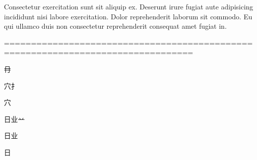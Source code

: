 \vspace{\mktsLineheight}\begin{multicols}{2}\raggedcolumns{}

Consectetur exercitation sunt sit aliquip ex. Deserunt irure fugiat aute adipisicing incididunt nisi labore exercitation.
Dolor reprehenderit laborum sit commodo. Eu qui ullamco duis non consectetur reprehenderit consequat amet fugiat
in.

=================================================================================

\null\par{\mktsTightParagraphs{}

{\cjk{}{\cnsym{}　}{\cnsym{}　}{\cnsym{}　}}\par
\null\par
{\cjk{}{\cnsym{}　}{\cnsym{}　}冄}\par
{\cjk{}{\cnsym{}　}{\cnsym{}　}{\cnsym{}　}}\par
\null\par
{\cjk{}{\cnsym{}　}穴{扌}}\par
{\cjk{}{\cnsym{}　}{\cnsym{}　}穴}\par
{\cjk{}{\cnsym{}　}{\cnsym{}　}{\cnsym{}　}}\par
\null\par
{\cjk{}日业{\cnxa{}䒑}}\par
{\cjk{}{\cnsym{}　}日业}\par
{\cjk{}{\cnsym{}　}{\cnsym{}　}日}\par
}
\end{multicols}
